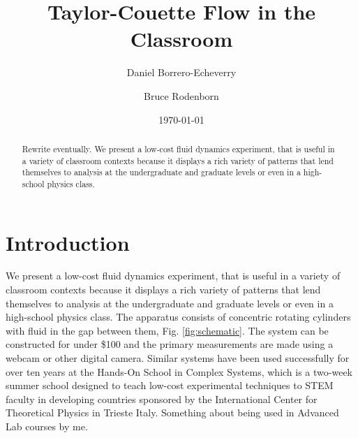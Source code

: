 \documentclass[%
reprint,
 amsmath,amssymb,
 aps,
prb,
floatfix,
longbibliography,
notitlepage
]{revtex4-1}
\newcommand{\DB}[1]{{\color{red}#1}} %
\begin{document}

\title{Taylor-Couette Flow in the Classroom}


\author{Daniel Borrero-Echeverry}

 
\author{Bruce Rodenborn}%
\date{\today}%

\begin{abstract}

Rewrite eventually. We present a low-cost fluid dynamics experiment, that is useful in a variety of classroom contexts because it displays a rich variety of patterns that lend themselves to analysis at the undergraduate and graduate levels or even in a high-school physics class. 

\end{abstract}

\maketitle


\section{Introduction}

We present a low-cost fluid dynamics experiment, that is useful in a variety of classroom contexts because it displays a rich variety of patterns that lend themselves to analysis at the undergraduate and graduate levels or even in a high-school physics class. The apparatus consists of concentric rotating cylinders with fluid in the gap between them, Fig. \ref{fig:schematic}. The system can be constructed for under \$100 and the primary measurements are made using a webcam or other digital camera. Similar systems have been used successfully for over ten years at the Hands-On School in Complex Systems, which is a two-week summer school designed to teach low-cost experimental techniques to STEM faculty in developing countries sponsored by the International Center for Theoretical Physics in Trieste Italy. \DB{Something about being used in Advanced Lab courses by me.}
\end{document}
